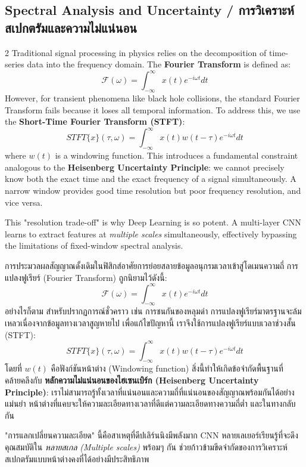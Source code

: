 \subsection{Spectral Analysis and Uncertainty \quad / \quad \textthai{การวิเคราะห์สเปกตรัมและความไม่แน่นอน}}
\begin{paracol}{2}
Traditional signal processing in physics relies on the decomposition of time-series data into the frequency domain. The \textbf{Fourier Transform} is defined as:
\begin{equation}
    \mathcal{F}(\omega) = \int_{-\infty}^{\infty} x(t) e^{-i\omega t} dt
\end{equation}
However, for transient phenomena like black hole collisions, the standard Fourier Transform fails because it loses all temporal information. To address this, we use the \textbf{Short-Time Fourier Transform (STFT)}:
\begin{equation}
    STFT\{x\}(\tau, \omega) = \int_{-\infty}^{\infty} x(t) w(t-\tau) e^{-i\omega t} dt
\end{equation}
where $w(t)$ is a windowing function. This introduces a fundamental constraint analogous to the \textbf{Heisenberg Uncertainty Principle}: we cannot precisely know both the exact time and the exact frequency of a signal simultaneously. A narrow window provides good time resolution but poor frequency resolution, and vice versa.

This "resolution trade-off" is why Deep Learning is so potent. A multi-layer CNN learns to extract features at \textit{multiple scales} simultaneously, effectively bypassing the limitations of fixed-window spectral analysis.

\switchcolumn

\begin{thai}
การประมวลผลสัญญาณดั้งเดิมในฟิสิกส์อาศัยการย่อยสลายข้อมูลอนุกรมเวลาเข้าสู่โดเมนความถี่ การแปลงฟูเรียร์ (Fourier Transform) ถูกนิยามไว้ดังนี้:
\begin{equation}
    \mathcal{F}(\omega) = \int_{-\infty}^{\infty} x(t) e^{-i\omega t} dt
\end{equation}
อย่างไรก็ตาม สำหรับปรากฏการณ์ชั่วคราว เช่น การชนกันของหลุมดำ การแปลงฟูเรียร์มาตรฐานจะล้มเหลวเนื่องจากข้อมูลทางเวลาสูญหายไป เพื่อแก้ไขปัญหานี้ เราจึงใช้การแปลงฟูเรียร์แบบเวลาช่วงสั้น (STFT):
\begin{equation}
    STFT\{x\}(\tau, \omega) = \int_{-\infty}^{\infty} x(t) w(t-\tau) e^{-i\omega t} dt
\end{equation}
โดยที่ $w(t)$ คือฟังก์ชันหน้าต่าง (Windowing function) สิ่งนี้ทำให้เกิดข้อจำกัดพื้นฐานที่คล้ายคลึงกับ \textbf{หลักความไม่แน่นอนของไฮเซนเบิร์ก (Heisenberg Uncertainty Principle)}: เราไม่สามารถรู้ทั้งเวลาที่แน่นอนและความถี่ที่แน่นอนของสัญญาณพร้อมกันได้อย่างแม่นยำ หน้าต่างที่แคบจะให้ความละเอียดทางเวลาที่ดีแต่ความละเอียดทางความถี่ต่ำ และในทางกลับกัน

"การแลกเปลี่ยนความละเอียด" นี้คือสาเหตุที่ดีปเลิร์นนิงมีพลังมาก CNN หลายเลเยอร์เรียนรู้ที่จะดึงคุณสมบัติใน \textit{หลายสเกล (Multiple scales)} พร้อมๆ กัน ช่วยก้าวข้ามขีดจำกัดของการวิเคราะห์สเปกตรัมแบบหน้าต่างคงที่ได้อย่างมีประสิทธิภาพ
\end{thai}
\end{paracol}
